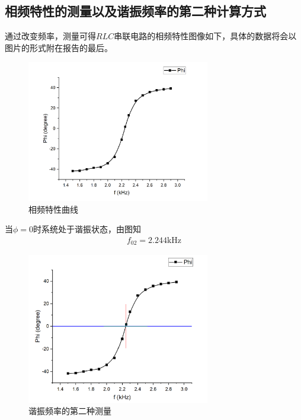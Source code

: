 \documentclass[a4paper]{ctexart}
\begin{document}
	\subsection{相频特性的测量以及谐振频率的第二种计算方式}
	通过改变频率，测量可得$RLC$串联电路的相频特性图像如下，具体的数据将会以图片的形式附在报告的最后。
	\begin{figure}[H]
		\centering
		\includegraphics[width=8cm]{phi.png}
		\caption{相频特性曲线}
	\end{figure}
	当$\phi=0$时系统处于谐振状态，由图知
	\begin{align}
		f_{02}=2.244\mathrm{kHz}
	\end{align}
	\begin{figure}[H]
		\centering
		\includegraphics[width=8cm]{phi1.png}
		\caption{谐振频率的第二种测量}
	\end{figure}
\end{document}
